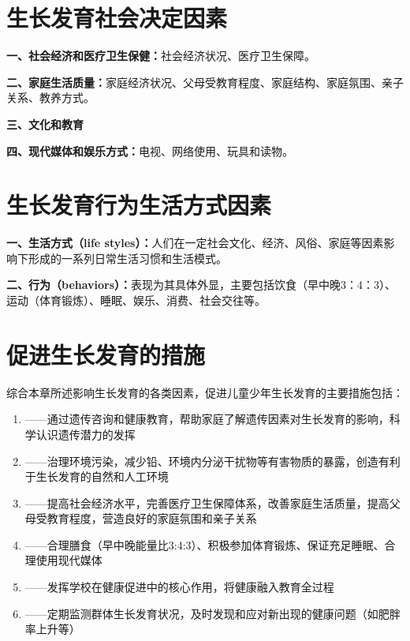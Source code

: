 \section{生长发育社会决定因素}

\begin{defbox}
\textbf{一、社会经济和医疗卫生保健：}社会经济状况、医疗卫生保障。

\textbf{二、家庭生活质量：}家庭经济状况、父母受教育程度、家庭结构、家庭氛围、亲子关系、教养方式。

\textbf{三、文化和教育}

\textbf{四、现代媒体和娱乐方式：}电视、网络使用、玩具和读物。
\end{defbox}

\section{生长发育行为生活方式因素}

\begin{defbox}
\textbf{一、生活方式（life styles）：}人们在一定社会文化、经济、风俗、家庭等因素影响下形成的一系列日常生活习惯和生活模式。

\textbf{二、行为（behaviors）：}表现为其具体外显，主要包括饮食（早中晚3：4：3）、运动（体育锻炼）、睡眠、娱乐、消费、社会交往等。
\end{defbox}

\section{促进生长发育的措施}

\begin{defbox}
综合本章所述影响生长发育的各类因素，促进儿童少年生长发育的主要措施包括：

\begin{enumerate}[leftmargin=*]
    \item {}——通过遗传咨询和健康教育，帮助家庭了解遗传因素对生长发育的影响，科学认识遗传潜力的发挥
    \item {}——治理环境污染，减少铅、环境内分泌干扰物等有害物质的暴露，创造有利于生长发育的自然和人工环境
    \item {}——提高社会经济水平，完善医疗卫生保障体系，改善家庭生活质量，提高父母受教育程度，营造良好的家庭氛围和亲子关系
    \item {}——合理膳食（早中晚能量比3:4:3）、积极参加体育锻炼、保证充足睡眠、合理使用现代媒体
    \item {}——发挥学校在健康促进中的核心作用，将健康融入教育全过程
    \item {}——定期监测群体生长发育状况，及时发现和应对新出现的健康问题（如肥胖率上升等）
\end{enumerate}
\end{defbox}

